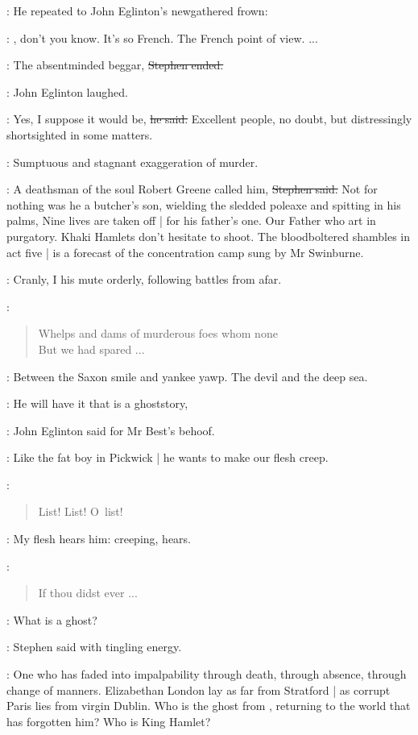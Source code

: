 :
He repeated to John Eglinton's newgathered frown:

\best:
,
don't you know.
It's so French.
The French point of view.
 ...

\Stephen:
The absentminded beggar,
\sout{Stephen ended.}

:
John Eglinton laughed.

\eglinton:
Yes,
I suppose it would be,
\sout{he said.}
Excellent people,
no doubt,
but distressingly shortsighted in some matters.

\StephenInt:
Sumptuous and stagnant exaggeration of murder.

\Stephen:
A deathsman of the soul Robert Greene called him,
\sout{Stephen said.}
Not for nothing was he a butcher's son,
wielding the sledded poleaxe and spitting in his palms,
Nine lives are taken off |
for his father's one.
Our Father who art in purgatory.
Khaki Hamlets don't hesitate to shoot.
The bloodboltered shambles in act five |
is a forecast of the concentration camp sung by Mr Swinburne.

\StephenInt:
Cranly,
I his mute orderly,
following battles from afar.

\StephenInt:
\begin{verse}
    Whelps and dams of murderous foes whom none \\
    But we had spared ...
\end{verse}

\StephenInt:
Between the Saxon smile and yankee yawp.
The devil and the deep sea.%

\eglinton:
He will have it that  is a ghoststory,

:
John Eglinton said for Mr Best's behoof.

\eglinton:
Like the fat boy in Pickwick |
he wants to make our flesh creep.

\StephenInt:
\begin{verse}
    List! List! O~list!
\end{verse}

\StephenInt:
My flesh hears him:
creeping, hears.

\StephenInt:
\begin{verse}
    If thou didst ever ...
\end{verse}

\Stephen:
What is a ghost?

:
Stephen said with tingling energy.

\Stephen:
One who has faded into impalpability through death,
through absence,
through change of manners.
Elizabethan London lay as far from Stratford |
as corrupt Paris lies from virgin Dublin.
Who is the ghost from ,
returning to the world that has forgotten him?
Who is King Hamlet?

